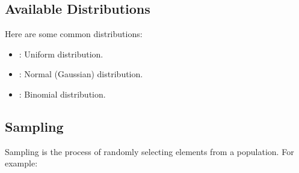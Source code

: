 \documentclass[letterpaper,10pt,english]{jupyterBook}
\begin{document}
\subsection{Available Distributions}
\label{\detokenize{01:available-distributions}}
\sphinxAtStartPar
Here are some common distributions:
\begin{itemize}
\item {} 
\sphinxAtStartPar
{} : Uniform distribution.

\item {} 
\sphinxAtStartPar
{} : Normal (Gaussian) distribution.

\item {} 
\sphinxAtStartPar
{} : Binomial distribution.

\end{itemize}


\subsection{Sampling}
\label{\detokenize{01:sampling}}
\sphinxAtStartPar
Sampling is the process of randomly selecting elements from a population. For example:
\end{document}
